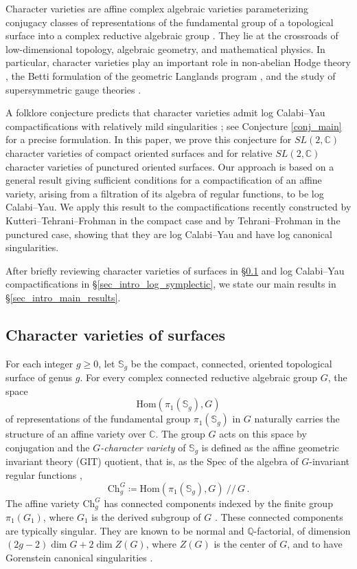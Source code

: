 \documentclass[12pt,letterpaper, reqno]{amsart}
\theoremstyle{defstyle} \newtheorem{definition}[theorem]{Definition}
\theoremstyle{remark}
\numberwithin{equation}{section}
\numberwithin{figure}{section}
\newcommand{\CC} {\mathbb{C}}
\newcommand{\bS} {\mathbb{S}}
\newcommand{\Hom} {\mathrm{Hom}}
\newcommand{\QQ} {\mathbb{Q}}
\begin{document}
Character varieties are affine complex algebraic varieties parameterizing conjugacy classes of representations of the fundamental group of a topological surface into a complex reductive algebraic group \cite{LM, sikora}. They lie at the crossroads of low-dimensional topology, algebraic geometry, and mathematical physics. 
In particular, character varieties play an important role in non-abelian Hodge theory \cite{simpson1994moduliI, simpson1994moduliII}, the Betti formulation of the geometric Langlands program \cite{ben2016betti}, and the study of supersymmetric gauge theories \cite{GMN_spectral}.


A folklore conjecture predicts that character varieties admit log Calabi--Yau compactifications with relatively mild singularities \cite{GHKK, KNPS, KS_WCS, simpson2016dual}; see Conjecture \ref{conj_main} for a precise formulation. In this paper, we prove this conjecture for $SL(2,\CC)$ character varieties of compact oriented surfaces and for relative $SL(2,\CC)$ character varieties of punctured oriented surfaces. Our approach is based on a general result giving sufficient conditions for a compactification of an affine variety, arising from a filtration of its algebra of regular functions, to be log Calabi--Yau. We apply this result to the compactifications recently constructed by Kutteri--Tehrani--Frohman \cite{ayilliath2025geometric} in the compact case and by Tehrani--Frohman \cite{farajzadeh2023compactifications} in the punctured case, showing that they are log Calabi--Yau and have log canonical singularities.

After briefly reviewing character varieties of surfaces in \S\ref{sec_intro_character} and log Calabi--Yau compactifications in \S\ref{sec_intro_log_symplectic}, we state our main results in \S\ref{sec_intro_main_results}.

\subsection{Character varieties of surfaces}
\label{sec_intro_character}
For each integer \( g \ge 0 \), let \( \bS_g \) be the compact, connected, oriented topological surface of genus \( g \).
For every complex connected reductive algebraic group $G$, the space
\[
\Hom(\pi_1(\bS_g), G)
\]
of representations of the fundamental group \( \pi_1(\bS_g) \) in \( G \) naturally carries the structure of an affine variety over $\CC$. The group \( G \) acts on this space by conjugation and
the \emph{\( G \)-character variety} of \( \bS_g \) is defined as the affine geometric invariant theory (GIT) quotient, that is, as the Spec of the algebra of $G$-invariant regular functions \cite{LM, sikora},
\[
\mathrm{Ch}_g^G \coloneqq \Hom(\pi_1(\bS_g), G)\ /\!/\, G\,.
\]
The affine variety $\mathrm{Ch}_g^G$ has connected components indexed by the finite group $\pi_1(G_1)$, where $G_1$ is the derived subgroup of $G$ \cite{shu2024singularities}. These connected components are typically singular. They are known to be normal and $\QQ$-factorial,
of dimension $(2g-2) \dim G +2 \dim Z(G)$, where $Z(G)$ is the center of $G$, and to have Gorenstein canonical singularities \cite{shu2024singularities}. 
\end{document}

